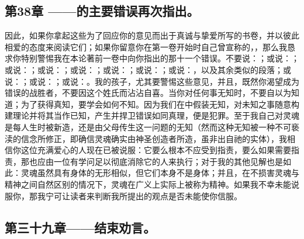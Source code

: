 
\subsection{第38章 ——的主要错误再次指出。}

因此，如果你拿起这些为了回应你的意见而出于真诚与挚爱所写的书卷，并以彼此相爱的态度来阅读它们；如果你留意你在第一卷开始时自己曾宣称的，，那么我恳求你特别警惕我在本论著前一卷中向你指出的那十一个错误。不要说：；或说：；或说：；或说：；或说：；或说：；或说：；或说：，以及其余类似的段落；或说：；或说：；或说：。\newline{}我的孩子，尤其要警惕这些意见，并且，既然你渴望成为错误的战胜者，不要因这个姓氏而沾沾自喜。当你对任何事无知时，不要自以为知道；为了获得真知，要学会如何不知。因为我们在中假装无知，对未知之事随意构建理论并将其当作已知，产生并捍卫错误如同真理，便是犯罪。至于我自己对灵魂是每人生时被新造，还是由父母传生这一问题的无知（然而这种无知被一种不可亵渎的信念所修正，即确信灵魂确实由神圣创造者所造，虽非出自祂的实体），我相信你这位充满爱心的人现在已被说服：它要么根本不应受到指责，要么如果需要指责，那也应由一位有学问足以彻底消除它的人来执行；对于我的其他见解也是如此：灵魂虽然具有身体的无形相似，但它们本身不是身体；并且，在不损害灵魂与精神之间自然区别的情况下，灵魂在广义上实际上被称为精神。如果我不幸未能说服你，那我宁可让读者来判断我所提出的观点是否未能使你信服。\par


\subsection{第三十九章——结束劝言。}

